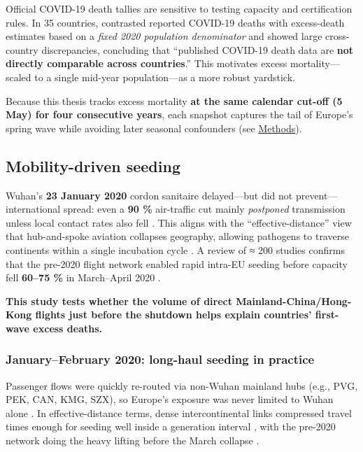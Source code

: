 \documentclass[
  authoryear,
  preprint,
  3p,
  onecolumn]{elsarticle}
\begin{document}
Official COVID-19 death tallies are sensitive to testing capacity and
certification rules. In 35 countries, \citet{kelly2021} contrasted
reported COVID-19 deaths with excess-death estimates based on a
\emph{fixed 2020 population denominator} and showed large cross-country
discrepancies, concluding that ``published COVID-19 death data are
\textbf{not directly comparable across countries}.'' This motivates
excess mortality---scaled to a single mid-year population---as a more
robust yardstick.

Because this thesis tracks excess mortality \textbf{at the same calendar
cut-off (5 May) for four consecutive years}, each snapshot captures the
tail of Europe's spring wave while avoiding later seasonal confounders
(see \hyperref[methods]{Methods}).

\subsection{Mobility-driven seeding}\label{mobility-driven-seeding}

Wuhan's \textbf{23 January 2020} cordon sanitaire delayed---but did not
prevent---international spread: even a \textbf{90 \%} air-traffic cut
mainly \emph{postponed} transmission unless local contact rates also
fell \citep{chinazzi2020}. This aligns with the ``effective-distance''
view that hub-and-spoke aviation collapses geography, allowing pathogens
to traverse continents within a single incubation cycle
\citep{brockmann2013}. A review of ≈ 200 studies confirms that the
pre-2020 flight network enabled rapid intra-EU seeding before capacity
fell \textbf{60--75 \%} in March--April 2020 \citep{sun2022_a}.

\textbf{This study tests whether the volume of direct
Mainland-China/Hong-Kong flights just before the shutdown helps explain
countries' first-wave excess deaths.}

\subsubsection{January--February 2020: long-haul seeding in
practice}\label{air-seed}

Passenger flows were quickly re-routed via non-Wuhan mainland hubs
(e.g., PVG, PEK, CAN, KMG, SZX), so Europe's exposure was never limited
to Wuhan alone \citep{chinazzi2020}. In effective-distance terms, dense
intercontinental links compressed travel times enough for seeding well
inside a generation interval \citep{brockmann2013}, with the pre-2020
network doing the heavy lifting before the March collapse
\citep{sun2022_a}.
\end{document}
